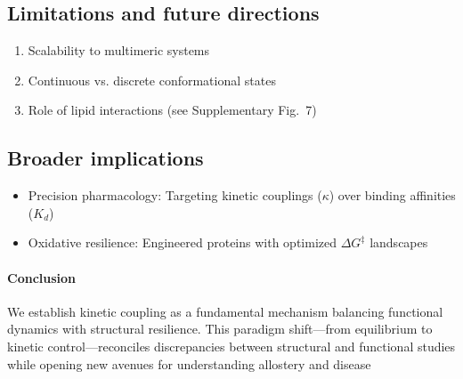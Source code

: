 \documentclass[pdflatex,sn-mathphys-num]{sn-jnl}%
\theoremstyle{thmstyleone}%
\theoremstyle{thmstyletwo}%
\theoremstyle{thmstylethree}%
\begin{document}
\subsection*{Limitations and future directions}
\begin{enumerate}
	\item Scalability to multimeric systems
	\item Continuous vs. discrete conformational states
	\item Role of lipid interactions (see Supplementary Fig.~7)
\end{enumerate}

\subsection*{Broader implications}
\begin{itemize}
	\item Precision pharmacology: Targeting kinetic couplings ($\kappa$) over binding affinities ($K_d$)
	\item Oxidative resilience: Engineered proteins with optimized $\Delta G^{\ddagger}$ landscapes
\end{itemize}

\paragraph*{Conclusion} We establish kinetic coupling as a fundamental mechanism balancing functional dynamics with structural resilience. This paradigm shift—from equilibrium to kinetic control—reconciles discrepancies between structural and functional studies while opening new avenues for understanding allostery and disease 
\end{document}
